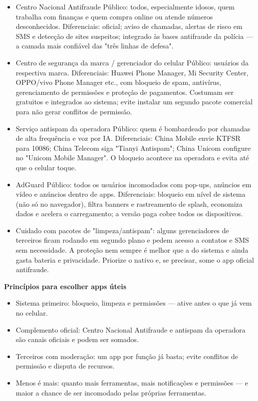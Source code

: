 
\begin{itemize}
  \item Centro Nacional Antifraude Público: todos, especialmente idosos, quem trabalha com finanças e quem compra online ou atende números desconhecidos. Diferenciais: oficial; aviso de chamadas, alertas de risco em SMS e detecção de sites suspeitos; integrado às bases antifraude da polícia — a camada mais confiável das "três linhas de defesa".
  \item Centro de segurança da marca / gerenciador do celular Público: usuários da respectiva marca. Diferenciais: Huawei Phone Manager, Mi Security Center, OPPO/vivo Phone Manager etc., com bloqueio de spam, antivírus, gerenciamento de permissões e proteção de pagamentos. Costumam ser gratuitos e integrados ao sistema; evite instalar um segundo pacote comercial para não gerar conflitos de permissão.
  \item Serviço antispam da operadora Público: quem é bombardeado por chamadas de alta frequência e voz por IA. Diferenciais: China Mobile envie KTFSR para 10086; China Telecom siga "Tianyi Antispam"; China Unicom configure no "Unicom Mobile Manager". O bloqueio acontece na operadora e evita até que o celular toque.
  \item AdGuard Público: todos os usuários incomodados com pop-ups, anúncios em vídeo e anúncios dentro de apps. Diferenciais: bloqueio em nível de sistema (não só no navegador), filtra banners e rastreamento de splash, economiza dados e acelera o carregamento; a versão paga cobre todos os dispositivos.
  \item Cuidado com pacotes de "limpeza/antispam": alguns gerenciadores de terceiros ficam rodando em segundo plano e pedem acesso a contatos e SMS sem necessidade. A proteção nem sempre é melhor que a do sistema e ainda gasta bateria e privacidade. Priorize o nativo e, se precisar, some o app oficial antifraude.
\end{itemize}

\textbf{Princípios para escolher apps úteis}\par

\begin{itemize}
  \item Sistema primeiro: bloqueio, limpeza e permissões — ative antes o que já vem no celular.
  \item Complemento oficial: Centro Nacional Antifraude e antispam da operadora são canais oficiais e podem ser somados.
  \item Terceiros com moderação: um app por função já basta; evite conflitos de permissão e disputa de recursos.
  \item Menos é mais: quanto mais ferramentas, mais notificações e permissões — e maior a chance de ser incomodado pelas próprias ferramentas.
\end{itemize}

